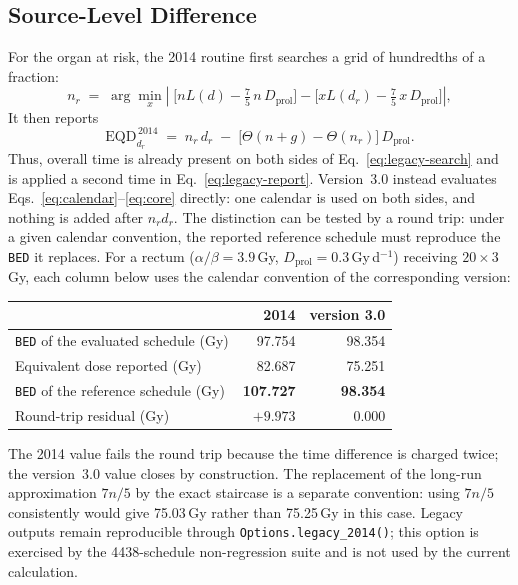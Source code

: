 \documentclass[preprint,12pt,number]{elsarticle}
\begin{document}
\subsection*{Source-Level Difference}
For the organ at risk, the 2014 routine first searches a grid of hundredths of a fraction:
    \begin{equation}
    n_r \;=\; \arg\min_{x} \left|\;
    \Big[n L(d)   - \tfrac{7}{5}\,n\,D_\mathrm{prol}\Big]
    -\Big[x L(d_r) - \tfrac{7}{5}\,x\,D_\mathrm{prol}\Big] \right| ,
    \label{eq:legacy-search}
    \end{equation}
It then reports
    \begin{equation}
    \mathrm{EQD}^{\,2014}_{d_r} \;=\; n_r\,d_r
    \;-\;\big[\Theta(n + g) - \Theta(n_r)\big]\,D_\mathrm{prol} .
    \label{eq:legacy-report}
    \end{equation}
Thus, overall time is already present on both sides of Eq.~\eqref{eq:legacy-search} and is applied a second time in Eq.~\eqref{eq:legacy-report}. Version~3.0 instead evaluates Eqs.~\eqref{eq:calendar}--\eqref{eq:core} directly: one calendar is used on both sides, and nothing is added after $n_r d_r$. The distinction can be tested by a round trip: under a given calendar convention, the reported reference schedule must reproduce the \texttt{BED} it replaces. For a rectum
($\alpha/\beta=3.9$\,Gy, $D_\mathrm{prol}=0.3$\,Gy\,d$^{-1}$) receiving $20\times3$\,Gy, each column below uses the calendar convention of the corresponding version:
    \begin{center}
    \small
    \begin{tabular}{@{}lrr@{}}
    \toprule
     & \textbf{2014} & \textbf{version 3.0} \\
    \midrule
    \texttt{BED} of the evaluated schedule (Gy)  & 97.754  & 98.354 \\
    Equivalent dose reported (Gy)                 & 82.687  & 75.251 \\
    \texttt{BED} of the reference schedule (Gy)  & \textbf{107.727} & \textbf{98.354} \\
    Round-trip residual (Gy)                       & $+9.973$ & $0.000$ \\
    \bottomrule
    \end{tabular}
    \end{center}
The 2014 value fails the round trip because the time difference is charged twice; the version~3.0 value closes by construction. The replacement of the long-run approximation $7n/5$ by the exact staircase is a separate convention: using $7n/5$ consistently would give 75.03\,Gy rather than 75.25\,Gy in this case. Legacy outputs remain reproducible through \texttt{Options.legacy\_2014()}; this option is exercised by the 4438-schedule non-regression suite and is not used by the current calculation.
\end{document}
